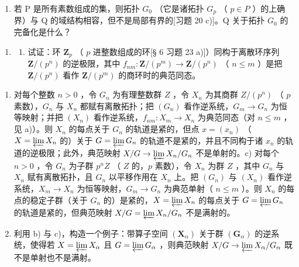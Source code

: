 \begin{enumerate}
\def\labelenumi{\alph{enumi})}
\setcounter{enumi}{1}
\tightlist
\item
  若 P 是所有素数组成的集，则拓扑 \(G_{0}\) （它是诸拓扑 \(G_{p}\) （ \(p \in P\) ）的上确界）与 Q 的域结构相容，但不是局部有界的{[}习题 20 c){]}。Q 关于拓扑 \(G_{0}\) 的完备化是什么？
\end{enumerate}

\BourbakiExerciseGroup

\begin{enumerate}
\def\labelenumi{\arabic{enumi})}
\tightlist
\item
  \begin{enumerate}
  \def\labelenumii{\alph{enumii})}
  \tightlist
  \item
    试证：环 \(\mathbf{Z}_p\) （ \(p\) 进整数组成的环{[}§ 6 习题 23 a){]}）同构于离散环序列 \(\mathbf{Z}/(p^n)\) 的逆极限，其中 \(f_{nm}: \mathbf{Z}/(p^m) \to \mathbf{Z}/(p^n)\) （ \(n \leqslant m\) ）是把 \(\mathbf{Z}/(p^n)\) 看作 \(\mathbf{Z}/(p^m)\) 的商环时的典范同态。
  \end{enumerate}
\end{enumerate}

\begin{enumerate}
\def\labelenumi{\alph{enumi})}
\setcounter{enumi}{1}
\item
  对每个整数 \(n > 0\) ，令 \(G_n\) 为有理整数群 \(Z\) ，令 \(X_n\) 为其商群 \(Z/(p^n)\) （ \(p\) 素数），\(G_n\) 与 \(X_n\) 都赋有离散拓扑；把 \((G_n)\) 看作逆系统，\(G_m \to G_n\) 为恒等映射；并把 \((X_n)\) 看作逆系统，\(f_{nm}: X_m \to X_n\) 为典范同态（对 \(n \leqslant m\) ，见 a)）。则 \(X_n\) 的每点关于 \(G_n\) 的轨道是紧的，但点 \(x = (x_n)\) （ \(X = \varprojlim X_n\) 的）关于 \(G = \varprojlim G_n\) 的轨道不是紧的，并且不同构于诸 \(x_n\) 的轨道的逆极限；此外，典范映射 \(X/G \to \varprojlim X_n/G_n\) 不是单射的。c) 对每个 \(n > 0\) ，令 \(G_n\) 为子群 \(p^n Z\) （ \(Z\) 的，\(p\) 素数），令 \(X_n\) 为群 \(Z\) ，其中 \(G_n\) 与 \(X_n\) 赋有离散拓扑，且 \(G_n\) 以平移作用在 \(X_n\) 上。把 \((G_n)\) 与 \((X_n)\) 看作逆系统，\(X_m \to X_n\) 为恒等映射，\(G_m \to G_n\) 为典范单射（ \(n \leqslant m\) ）。则 \(X_n\) 的每点的稳定子群（关于 \(G_n\) 的）是紧的，\(X = \varprojlim X_n\) 的每点关于 \(G = \varprojlim G_n\) 的轨道是紧的，但典范映射 \(X/G = \varprojlim X_n/G_n\) 不是满射的。
\item
  利用 b) 与 c)，构造一个例子：带算子空间 \((\mathbf{X}_{\alpha})\) 关于群 \((\mathbf{G}_{\alpha})\) 的逆系统，使得若 \(X = \varprojlim X_{\alpha}\) 且 \(G = \varprojlim G_{\alpha}\) ，则典范映射 \(X/G \to \varprojlim X_{\alpha}/G_{\alpha}\) 既不是单射也不是满射。
\end{enumerate}


